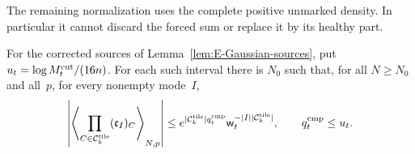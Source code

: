 The remaining normalization uses the complete positive unmarked density. In particular it cannot discard the forced sum or replace it by its healthy part.
\begin{samepage}
\begin{lemma}\label{lem:E-source-integral}
For the corrected sources of Lemma~\ref{lem:E-Gaussian-sources}, put $u_t=\log M^{\mathrm{cut}}_t/(16n)$. For each such interval there is $N_0$ such that, for all $N\ge N_0$ and all~$p$, for every nonempty mode~$I$,
\begin{equation*}
 \left|\left\langle\prod_{C\in\mathcal C^{\rm tile}_k}(\mathfrak c_I)_C\right\rangle_{N,p}\right|
 \le e^{|\mathcal C^{\rm tile}_k|q_t^{\rm cmp}}
       \mathsf w_t^{-|I||\mathcal C^{\rm tile}_k|},
 \qquad q_t^{\rm cmp}\le u_t.
\end{equation*}
\end{lemma}
\end{samepage}
